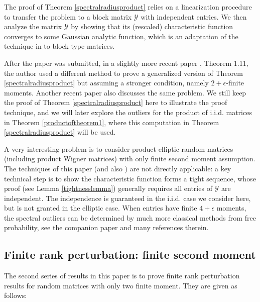 \documentclass[12pt, reqno]{amsart}
\theoremstyle{definition}
\theoremstyle{remark}
\numberwithin{equation}{section}
\begin{document}
The proof of Theorem \ref{spectralradiusproduct} relies on a linearization procedure to transfer the problem to a block matrix $\mathcal{Y}$ with independent entries. We then analyze the matrix $\mathcal{Y}$ by showing that its (rescaled) characteristic function converges to some Gaussian analytic function, which is an adaptation of the technique in \cite{bordenave2021convergence} to block type matrices.


After the paper was submitted, in a slightly more recent paper \cite{han2025spectral}, Theorem 1.11, the author used a different method to prove a generalized version of Theorem \ref{spectralradiusproduct} but assuming a stronger condition, namely $2+\epsilon$-finite moments. Another recent paper \cite{hachem2025spectral} also discusses the same problem. We still keep the proof of Theorem \ref{spectralradiusproduct} here to illustrate the proof technique, and we will later explore the outliers for the product of i.i.d. matrices in Theorem \ref{productoftheorem1}, where this computation in Theorem \ref{spectralradiusproduct} will be used.



A very interesting problem is to consider product elliptic random matrices (including product Wigner matrices) with only finite second moment assumption. The techniques of this paper (and also \cite{bordenave2021convergence}) are not directly applicable: a key technical step is to show the characteristic function forms a tight sequence, whose proof (see Lemma \ref{tightnesslemma}) generally requires all entries of $\mathcal{Y}$ are independent. The independence is guaranteed in the i.i.d. case we consider here, but is not granted in the elliptic case. When entries have finite $4+\epsilon$ moments, the spectral outliers can be determined by much more classical methods from free probability, see the companion paper \cite{han2024outliers} and many references therein.

\subsection{Finite rank perturbation: finite second moment}
The second series of results in this paper is to prove finite rank perturbation results for random matrices with only two finite moment. They are given as follows: 
\end{document}
